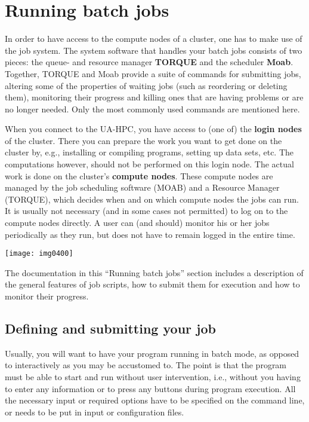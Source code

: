 \chapter{Running batch jobs}

In order to have access to the compute nodes of a cluster, one has to make use of the job system. The system software that handles your batch jobs consists of two pieces: the queue- and resource manager \textbf{TORQUE} and the scheduler \textbf{Moab}. Together, TORQUE and Moab provide a suite of commands for submitting jobs, altering some of the properties of waiting jobs (such as reordering or deleting them), monitoring their progress and killing ones that are having problems or are no longer needed. Only the most commonly used commands are mentioned here.

When you connect to the UA-HPC, you have access to (one of) the \textbf{login nodes} of the cluster. There you can prepare the work you want to get done on the cluster by, e.g., installing or compiling programs, setting up data sets, etc. The computations however, should not be performed on this login node. The actual work is done on the cluster's \textbf{compute nodes}. These compute nodes are managed by the job scheduling software (MOAB) and a Resource Manager (TORQUE), which decides when and on which compute nodes the jobs can run. It is usually not necessary (and in some cases not permitted) to log on to the compute nodes directly. A user can (and should) monitor his or her jobs periodically as they run, but does not have to remain logged in the entire time.

\texttt{[image: img0400]}

The documentation in this ``Running batch jobs'' section includes a description of the general features of job scripts, how to submit them for execution and how to monitor their progress.

\section{Defining and submitting your job}

Usually, you will want to have your program running in batch mode, as opposed to interactively as you may be accustomed to. The point is that the program must be able to start and run without user intervention, i.e., without you having to enter any information or to press any buttons during program execution. All the necessary input or required options have to be specified on the command line, or needs to be put in input or configuration files.

